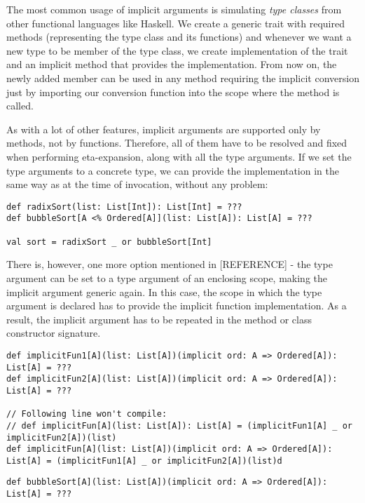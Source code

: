 The most common usage of implicit arguments is simulating \textit{type classes} from other functional languages like Haskell. We create a generic trait with required methods (representing the type class and its functions) and whenever we want a new type to be member of the type class, we create implementation of the trait and an implicit method that provides the implementation. From now on, the newly added member can be used in any method requiring the implicit conversion just by importing our conversion function into the scope where the method is called.


As with a lot of other features, implicit arguments are supported only by methods, not by functions. Therefore, all of them have to be resolved and fixed when performing eta-expansion, along with all the type arguments. If we set the type arguments to a concrete type, we can provide the implementation in the same way as at the time of invocation, without any problem:

\lstset{style=Scala}
\begin{lstlisting}
def radixSort(list: List[Int]): List[Int] = ???
def bubbleSort[A <% Ordered[A]](list: List[A]): List[A] = ???

val sort = radixSort _ or bubbleSort[Int]
\end{lstlisting}

There is, however, one more option mentioned in [REFERENCE] - the type argument can be set to a type argument of an enclosing scope, making the implicit argument generic again. In this case, the scope in which the type argument is declared has to provide the implicit function implementation. As a result, the implicit argument has to be repeated in the method or class constructor signature.

\lstset{style=Scala}
\begin{lstlisting}
def implicitFun1[A](list: List[A])(implicit ord: A => Ordered[A]): List[A] = ???
def implicitFun2[A](list: List[A])(implicit ord: A => Ordered[A]): List[A] = ???

// Following line won't compile:
// def implicitFun[A](list: List[A]): List[A] = (implicitFun1[A] _ or implicitFun2[A])(list)
def implicitFun[A](list: List[A])(implicit ord: A => Ordered[A]): List[A] = (implicitFun1[A] _ or implicitFun2[A])(list)d
\end{lstlisting}

\lstset{style=Scala}
\begin{lstlisting}
def bubbleSort[A](list: List[A])(implicit ord: A => Ordered[A]): List[A] = ???
\end{lstlisting}

